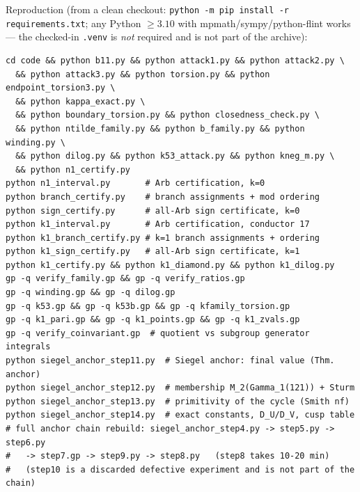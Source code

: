 \documentclass[preprint,12pt]{elsarticle}
\theoremstyle{definition}
\theoremstyle{remark}
\begin{document}
Reproduction (from a clean checkout:
\texttt{python -m pip install -r requirements.txt}; any Python $\ge3.10$
with mpmath/sympy/python-flint works --- the checked-in \texttt{.venv} is
\emph{not} required and is not part of the archive):
{\footnotesize
\begin{verbatim}
cd code && python b11.py && python attack1.py && python attack2.py \
  && python attack3.py && python torsion.py && python endpoint_torsion3.py \
  && python kappa_exact.py \
  && python boundary_torsion.py && python closedness_check.py \
  && python ntilde_family.py && python b_family.py && python winding.py \
  && python dilog.py && python k53_attack.py && python kneg_m.py \
  && python n1_certify.py
python n1_interval.py       # Arb certification, k=0
python branch_certify.py    # branch assignments + mod ordering
python sign_certify.py      # all-Arb sign certificate, k=0
python k1_interval.py       # Arb certification, conductor 17
python k1_branch_certify.py # k=1 branch assignments + ordering
python k1_sign_certify.py   # all-Arb sign certificate, k=1
python k1_certify.py && python k1_diamond.py && python k1_dilog.py
gp -q verify_family.gp && gp -q verify_ratios.gp
gp -q winding.gp && gp -q dilog.gp
gp -q k53.gp && gp -q k53b.gp && gp -q kfamily_torsion.gp
gp -q k1_pari.gp && gp -q k1_points.gp && gp -q k1_zvals.gp
gp -q verify_coinvariant.gp  # quotient vs subgroup generator integrals
python siegel_anchor_step11.py  # Siegel anchor: final value (Thm. anchor)
python siegel_anchor_step12.py  # membership M_2(Gamma_1(121)) + Sturm
python siegel_anchor_step13.py  # primitivity of the cycle (Smith nf)
python siegel_anchor_step14.py  # exact constants, D_U/D_V, cusp table
# full anchor chain rebuild: siegel_anchor_step4.py -> step5.py -> step6.py
#   -> step7.gp -> step9.py -> step8.py   (step8 takes 10-20 min)
#   (step10 is a discarded defective experiment and is not part of the chain)
\end{verbatim}
}
\end{document}
